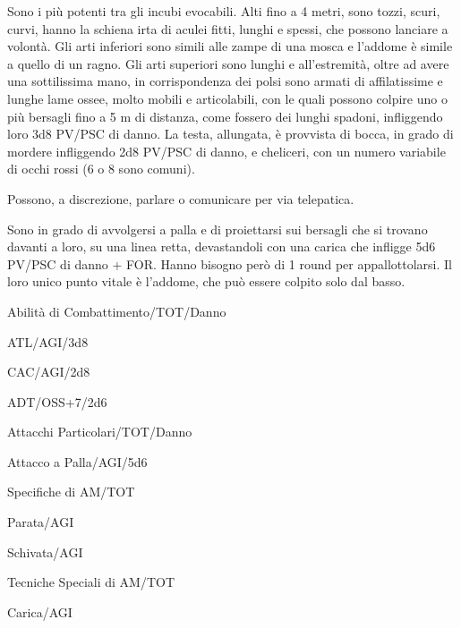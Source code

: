 
Sono i pi\`u potenti tra gli incubi evocabili. Alti fino a 4 metri,
sono tozzi, scuri, curvi, hanno la schiena irta di aculei fitti,
lunghi e spessi, che possono lanciare a volont\`a. Gli arti
inferiori sono simili alle zampe di una mosca e l'addome \`e simile
a quello di un ragno. Gli arti superiori sono lunghi e
all'estremit\`a, oltre ad avere una sottilissima mano, in
corrispondenza dei polsi sono armati di affilatissime e lunghe lame
ossee, molto mobili e articolabili, con le quali possono colpire uno o
pi\`u bersagli fino a 5 m di distanza, come fossero dei lunghi
spadoni, infliggendo loro 3d8 PV/PSC di danno. La testa, allungata,
\`e provvista di bocca, in grado di mordere infliggendo 2d8 PV/PSC
di danno, e cheliceri, con un numero variabile di occhi rossi (6 o 8
sono comuni).  

Possono, a discrezione, parlare o comunicare per via
telepatica.

Sono in grado di avvolgersi a palla e di proiettarsi sui bersagli che
si trovano davanti a loro, su una linea retta, devastandoli con una
carica che infligge 5d6 PV/PSC di danno + FOR. Hanno bisogno per\`o
di 1 round per appallottolarsi.  Il loro unico punto vitale \`e
l'addome, che pu\`o essere colpito solo dal basso.


\begin{parmostro}{Abilit\`a di Combattimento/TOT/Danno}
\item ATL/AGI/3d8
\item CAC/AGI/2d8
\item ADT/OSS+7/2d6
\end{parmostro}

\begin{parmostro}{Attacchi Particolari/TOT/Danno}
\item  Attacco a Palla/AGI/5d6
\end{parmostro}

\begin{parmostro}{Specifiche di AM/TOT}
\item Parata/AGI
\item Schivata/AGI
\end{parmostro}

\begin{parmostro}{Tecniche Speciali di AM/TOT}
\item Carica/AGI
\end{parmostro}

